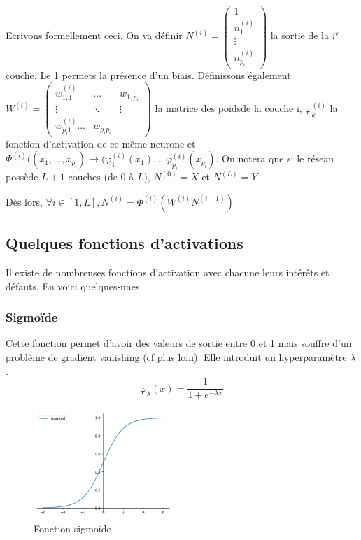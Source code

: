 Ecrivons formellement ceci. On va définir $N^{(i)}  = \begin{pmatrix} 1\\ n_1^{(i)}\\ \vdots \\ n_{p_i}^{(i)} \end{pmatrix}$ la sortie de la $i^e$ couche. Le 1 permets la présence d'un biais.  
Définissons également $W^{(i)} = \begin{pmatrix} w_{1,1}^{(i)}& \hdots & w_{1, p_i} \\  \vdots & \ddots &  \vdots \\ w_{p_i1}^{(i)}  \hdots & w_{p_ip_i} \end{pmatrix}$ la matrice des poidsde la couche i, $\varphi_k^{(i)}$ la fonction d'activation de ce même neurone et $\Phi^{(i)}((x_1,...,x_{p_i}) \to (\varphi_1^{(i)}(x_1), ... \varphi^{(i)}_{p_i}(x_{p_i})$. 
On notera que si le réseau possède $L+1$ couches (de $0$ à $ L$), $N^{(0)} = X$ et $N^{(L)} = Y$

Dès lors, $\forall i \in [1,L], N^{(i)} = \Phi^{(i)}(W^{(i)}N^{(i-1)}) $





\subsection{Quelques fonctions d'activations}
Il existe de nombreuses fonctions d'activation avec chacune leurs intérêts et défauts. En voici quelques-unes.
\subsubsection{Sigmoïde}
 Cette fonction permet d'avoir des valeurs de sortie entre 0 et 1 mais souffre d'un problème de gradient vanishing (cf plus loin). Elle introduit un hyperparamètre $\lambda$.
\begin{displaymath}
\varphi_\lambda (x) = \frac{1}{1+e^{-\lambda x}}
\end{displaymath}

\begin{figure}[!h]
\centering
\includegraphics[width=150pt]{"images/MLP/sigmoide2"}
\caption{Fonction sigmoïde\\}
\label{sigmoide}
\end{figure}



